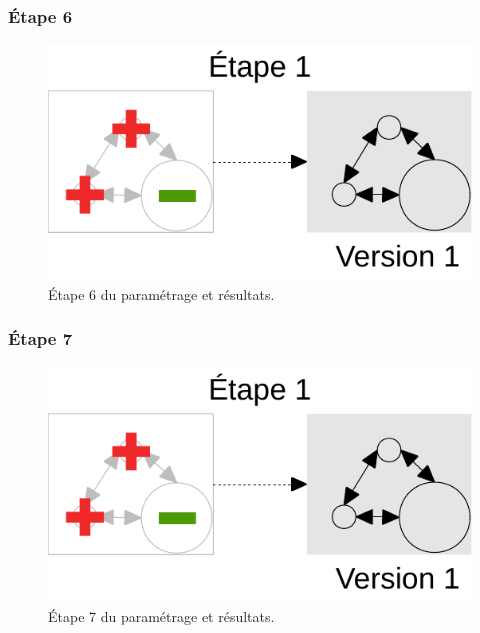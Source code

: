 	\subsubsection{Étape 6}
		\begin{figure}[H]
			\centering
			\includegraphics[width = \linewidth, page = 6]{img/schemas_etapes_individuelles.pdf}
			\caption{Étape 6 du paramétrage et résultats.}
		\end{figure}

\pagebreak
	\subsubsection{Étape 7}
		\begin{figure}[H]
			\centering
			\includegraphics[width = \linewidth, page = 7]{img/schemas_etapes_individuelles.pdf}
			\caption{Étape 7 du paramétrage et résultats.}
		\end{figure}

\pagebreak
